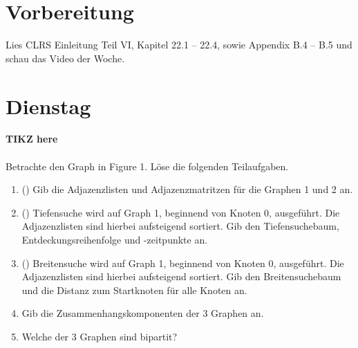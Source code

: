 \documentclass{uebung_cs}
\begin{document}
\section*{Vorbereitung}
Lies CLRS Einleitung Teil VI, Kapitel 22.1 -- 22.4, sowie Appendix B.4 -- B.5 und schau das Video der Woche.

\section*{Dienstag}
\begin{aufgabe}\label{tue-first}\mbox{}
	\textbf{TIKZ here}\\\\
	Betrachte den Graph in Figure 1.
	Löse die folgenden Teilaufgaben.
	\begin{enumerate}
		\item (\warmup) Gib die Adjazenzlisten und Adjazenzmatritzen für die Graphen 1 und 2 an.
		\item (\warmup) Tiefensuche wird auf Graph 1, beginnend von Knoten 0, ausgeführt.
		Die Adjazenzlisten sind hierbei aufsteigend sortiert.
		Gib den Tiefensuchebaum, Entdeckungsreihenfolge und -zeitpunkte an.
		\item (\warmup) Breitensuche wird auf Graph 1, beginnend von Knoten 0, ausgeführt.
		Die Adjazenzlisten sind hierbei aufsteigend sortiert.
		Gib den Breitensuchebaum und die Distanz zum Startknoten für alle Knoten an.
		\item Gib die Zusammenhangskomponenten der 3 Graphen an.
		\item Welche der 3 Graphen sind bipartit?
	\end{enumerate}
\end{aufgabe}
\end{document}
